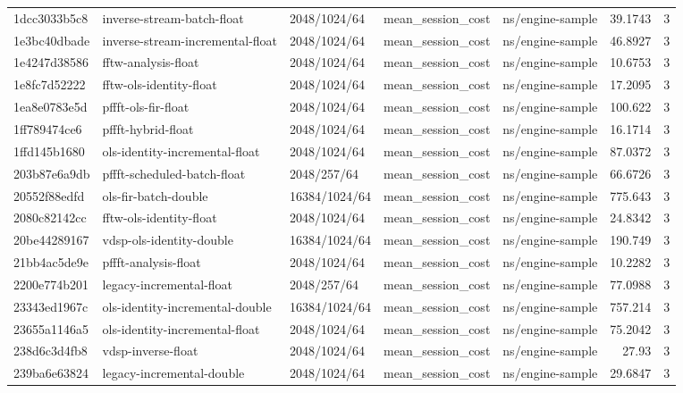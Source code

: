 \begin{longtable}{lllllrr}
1dcc3033b5c8 & inverse-stream-batch-float & 2048/1024/64 & mean\_session\_cost & ns/engine-sample & 39.1743 & 3 \\
1e3bc40dbade & inverse-stream-incremental-float & 2048/1024/64 & mean\_session\_cost & ns/engine-sample & 46.8927 & 3 \\
1e4247d38586 & fftw-analysis-float & 2048/1024/64 & mean\_session\_cost & ns/engine-sample & 10.6753 & 3 \\
1e8fc7d52222 & fftw-ols-identity-float & 2048/1024/64 & mean\_session\_cost & ns/engine-sample & 17.2095 & 3 \\
1ea8e0783e5d & pffft-ols-fir-float & 2048/1024/64 & mean\_session\_cost & ns/engine-sample & 100.622 & 3 \\
1ff789474ce6 & pffft-hybrid-float & 2048/1024/64 & mean\_session\_cost & ns/engine-sample & 16.1714 & 3 \\
1ffd145b1680 & ols-identity-incremental-float & 2048/1024/64 & mean\_session\_cost & ns/engine-sample & 87.0372 & 3 \\
203b87e6a9db & pffft-scheduled-batch-float & 2048/257/64 & mean\_session\_cost & ns/engine-sample & 66.6726 & 3 \\
20552f88edfd & ols-fir-batch-double & 16384/1024/64 & mean\_session\_cost & ns/engine-sample & 775.643 & 3 \\
2080c82142cc & fftw-ols-identity-float & 2048/1024/64 & mean\_session\_cost & ns/engine-sample & 24.8342 & 3 \\
20be44289167 & vdsp-ols-identity-double & 16384/1024/64 & mean\_session\_cost & ns/engine-sample & 190.749 & 3 \\
21bb4ac5de9e & pffft-analysis-float & 2048/1024/64 & mean\_session\_cost & ns/engine-sample & 10.2282 & 3 \\
2200e774b201 & legacy-incremental-float & 2048/257/64 & mean\_session\_cost & ns/engine-sample & 77.0988 & 3 \\
23343ed1967c & ols-identity-incremental-double & 16384/1024/64 & mean\_session\_cost & ns/engine-sample & 757.214 & 3 \\
23655a1146a5 & ols-identity-incremental-float & 2048/1024/64 & mean\_session\_cost & ns/engine-sample & 75.2042 & 3 \\
238d6c3d4fb8 & vdsp-inverse-float & 2048/1024/64 & mean\_session\_cost & ns/engine-sample & 27.93 & 3 \\
239ba6e63824 & legacy-incremental-double & 2048/1024/64 & mean\_session\_cost & ns/engine-sample & 29.6847 & 3 \\

\end{longtable}
